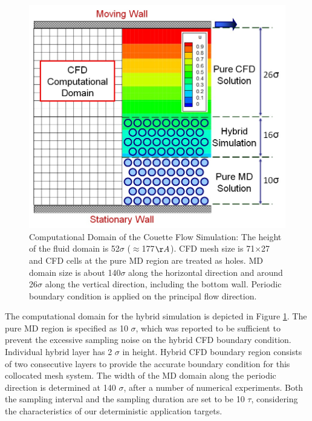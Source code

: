 \documentclass[]{aiaa-tc}%
\begin{document}
\begin{figure}
\includegraphics{Couette_Val_Domain.jpg}
\caption{Computational Domain of the Couette Flow Simulation: The height 
of the fluid domain is 52$\sigma$ ($\approx$177$\AA$). CFD mesh size is 
71$\times$27 and CFD cells at the pure MD region are treated as holes. 
MD domain size is about 140$\sigma$ along the horizontal direction and 
around 26$\sigma$ along the vertical direction, including the bottom wall. 
Periodic boundary condition is applied on the principal flow direction.}
\label{Fig:Couette_Val_Domain}
\end{figure}


The computational domain for the hybrid simulation is depicted in Figure
\ref{Fig:Couette_Val_Domain}. The pure MD region is specified as 10 $\sigma$, 
which was reported to be sufficient to prevent the excessive sampling noise
on the hybrid CFD boundary condition.\cite{Yen} Individual hybrid layer has
2 $\sigma$ in height. Hybrid CFD boundary region consists of two consecutive 
layers to provide the accurate boundary condition for this collocated mesh system.
The width of the MD domain along the periodic direction is determined at 140 
$\sigma$, after a number of numerical experiments.
Both the sampling interval and the sampling duration are set to be 10 $\tau$,
considering the characteristics of our deterministic application targets. 
\end{document}
